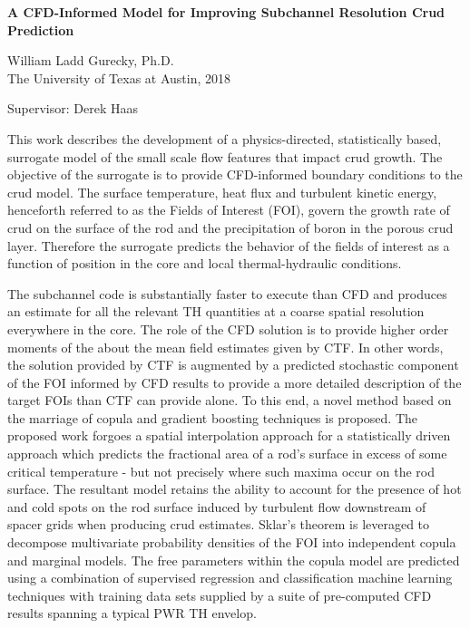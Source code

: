 
\begin{center}
	\large{
		\bf{A CFD-Informed Model for Improving Subchannel Resolution Crud Prediction}
	}
	\vspace{1cm}
	
	\small{	

	William Ladd Gurecky, Ph.D. \\
	The University of Texas at Austin, 2018
   
    \vspace{1cm} 
   	Supervisor:  Derek Haas
    }
\end{center}
\vspace{1cm}

\small{
This work describes the development of a physics-directed, statistically based,
surrogate model of the small scale flow features that impact crud growth. The objective of the surrogate
is to provide CFD-informed boundary conditions to the crud model. The surface temperature, heat
flux and turbulent kinetic energy, henceforth referred to as the Fields of Interest (FOI),
govern the growth rate of crud on the surface of the rod and the
precipitation of boron in the porous crud layer. Therefore the surrogate predicts the behavior of the
fields of interest as a function of position in the core and local thermal-hydraulic conditions.

The subchannel code is substantially faster to execute than CFD
and produces an estimate for all the relevant TH quantities at a coarse spatial resolution everywhere in
the core. The role of the CFD solution is to provide higher order moments of the about the mean field estimates
given by CTF. In other words, the solution provided by CTF is augmented by a predicted stochastic
component of the FOI informed by CFD results to provide a more detailed description of the target
FOIs than CTF can provide alone. To this end, a novel method based on the marriage of copula and
gradient boosting techniques is proposed. The proposed work forgoes a spatial interpolation approach
for a statistically driven approach which predicts the fractional area of a rod’s surface in excess of some
critical temperature - but not precisely where such maxima occur on the rod surface.
The resultant model retains the ability to account for the presence
of hot and cold spots on the rod surface induced by turbulent flow downstream of spacer grids when
producing crud estimates. Sklar’s theorem is leveraged to decompose multivariate probability densities
of the FOI into independent copula and marginal models. The free parameters within the copula model
are predicted using a combination of supervised regression and classification machine learning techniques
with training data sets supplied by a suite of pre-computed CFD results spanning a typical PWR TH
envelop.
}